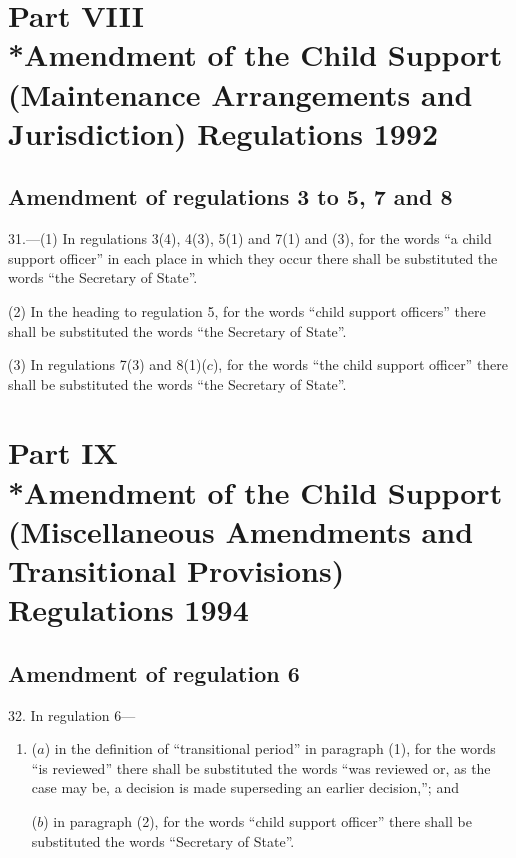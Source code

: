 \documentclass[12pt,a4paper]{article}
\begin{document}
\section[Part VIII --- Amendment of the Child Support (Maintenance Arrangements and Jurisdiction) Regulations 1992]{Part VIII\\*Amendment of the Child Support (Maintenance Arrangements and Jurisdiction) Regulations 1992}

\renewcommand\parthead{--- Part VIII}

\subsection[31. Amendment of regulations 3 to 5, 7 and 8]{Amendment of regulations 3 to 5, 7 and 8}

31.—(1) In regulations 3(4), 4(3), 5(1) and 7(1) and (3), for the words “a child support officer” in each place in which they occur there shall be substituted the words “the Secretary of State”.

(2) In the heading to regulation 5, for the words “child support officers” there shall be substituted the words “the Secretary of State”.

(3) In regulations 7(3) and 8(1)($c$), for the words “the child support officer” there shall be substituted the words “the Secretary of State”.

\section[Part IX --- Amendment of the Child Support (Miscellaneous Amendments and Transitional Provisions) Regulations 1994]{Part IX\\*Amendment of the Child Support (Miscellaneous Amendments and Transitional Provisions) Regulations 1994}

\renewcommand\parthead{--- Part IX}

\subsection[32. Amendment of regulation 6]{Amendment of regulation 6}

32.  In regulation 6—
\begin{enumerate}\item[]
($a$) in the definition of “transitional period” in paragraph (1), for the words “is reviewed” there shall be substituted the words “was reviewed or, as the case may be, a decision is made superseding an earlier decision,”; and

($b$) in paragraph (2), for the words “child support officer” there shall be substituted the words “Secretary of State”.
\end{enumerate}
\end{document}
